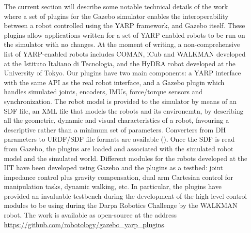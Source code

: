 The current section will describe some notable technical details of the work~\cite{hoffman2014yarp} where a set of plugins for the Gazebo simulator  enables the interoperability between a robot controlled using the YARP framework, and Gazebo itself. These plugins allow applications written for a set of YARP-enabled robots to be run on the simulator with no changes. At the moment of writing, a non-comprehensive list of YARP-enabled robots includes COMAN, iCub and WALKMAN developed at the Istituto Italiano di Tecnologia, and the HyDRA robot developed at the University of Tokyo. Our plugins have two main components: a YARP interface with the same API as the real robot interface, and a Gazebo plugin which handles simulated joints, encoders, IMUs, force/torque sensors and synchronization. The robot model is provided to the simulator by means of an SDF file, an XML file that models the robots and its environemtn, by describing all the geometric, dynamic and visual characteristics of a robot, favouring a descriptive rather than a minimum set of parameters. Converters from DH parameters to URDF/SDF file formats are available ().
Once the SDF is read from Gazebo, the plugins are loaded and associated with the simulated robot model and the simulated world. Different modules for the robots developed at the IIT have been developed using Gazebo and the plugins as a testbed: joint impedance control plus gravity compensation, dual arm Cartesian control for manipulation tasks, dynamic walking, etc. In particular, the plugins have provided an invaluable testbench during the development of the high-level control modules to be using during the Darpa Robotics Challenge by the WALKMAN robot.
The work is available as open-source at the address \url{https://github.com/robotology/gazebo_yarp_plugins}.

